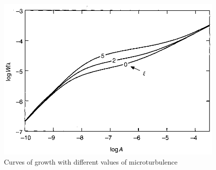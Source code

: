 \documentclass[dvips,12pt,a4paper]{report}
\begin{document}
{\begin{figure}[h]
\centering
\includegraphics[height=5 cm]{pics/parte2/vtur.eps}
\caption[Curve of growth with different values of microturbulence] {Curves of growth with different values of microturbulence}
\label{microturb}
\end{figure}








}
\end{document}
